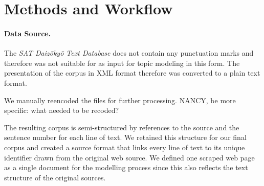 \documentclass[a4paper,10pt]{article}
\newcommand{\TODO}[1]{\begingroup\color{red}#1\endgroup}
\begin{document}
\section{Methods and Workflow} 

\paragraph{Data Source.} The \textit{SAT Daiz{\=o}ky{\=o} Text
    Database}  does not contain any
  punctuation marks and therefore was not suitable for as input for topic
  modeling in this form. The presentation of the corpus in XML format
  \TODO{\cite{DaiCD}} therefore was converted to a plain text format.
  
  We manually reencoded the files for further processing.
  \TODO{NANCY, be more specific: what needed to be recoded?} 

  The resulting corpus is semi-structured by references to the source and
  the sentence number for each line of text. We retained this structure for
  our final corpus and created a source format that links every line of
  text to its unique identifier drawn from the original web source. We
  defined one scraped web page as a single document for the modelling
  process since this also reflects the text structure of the original
  sources.
    
\end{document}
